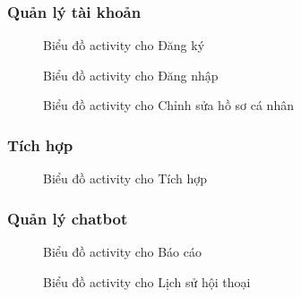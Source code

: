\subsubsection{Quản lý tài khoản}
\begin{figure}[H]
    \centering
     
    \vspace{0.5cm}
    \caption{Biểu đồ activity cho Đăng ký}
    \label{fig:enter-label}
\end{figure}
\begin{figure}[H]
    \centering
     
    \vspace{0.5cm}
    \caption{Biểu đồ activity cho Đăng nhập}
    \label{fig:enter-label}
\end{figure}
\begin{figure}[H]
    \centering
     
    \vspace{0.5cm}
    \caption{Biểu đồ activity cho Chỉnh sửa hồ sơ cá nhân}
    \label{fig:enter-label}
\end{figure}


\subsubsection{Tích hợp}
\begin{figure}[H]
    \centering
     
    \vspace{0.5cm}
    \caption{Biểu đồ activity cho Tích hợp}
    \label{fig:enter-label}
\end{figure}
\subsubsection{Quản lý chatbot}
\begin{figure}[H]
    \centering
     
    \vspace{0.5cm}
    \caption{Biểu đồ activity cho Báo cáo}
    \label{fig:enter-label}
\end{figure}
\begin{figure}[H]
    \centering
     
    \vspace{0.5cm}
    \caption{Biểu đồ activity cho Lịch sử hội thoại}
    \label{fig:enter-label}
\end{figure}

